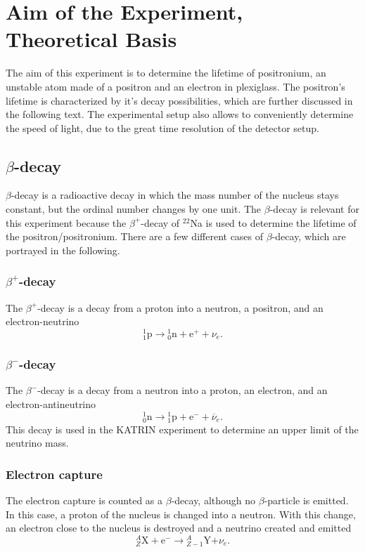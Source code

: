 \chapter{Aim of the Experiment, Theoretical Basis }

The aim of this experiment is to determine the lifetime of positronium, an unstable atom made of a positron and an electron in plexiglass. The positron's lifetime is characterized by it's decay possibilities, which are further discussed in the following text. The experimental setup also allows to conveniently determine the speed of light, due to the great time resolution of the detector setup.

\section{$\beta$-decay}
$\beta$-decay is a radioactive decay in which the mass number of the nucleus stays constant, but the ordinal number changes by one unit. The $\beta$-decay is relevant for this experiment because the $\beta^+$-decay of $^{22}$Na is used to determine the lifetime of the positron/positronium. There are a few different cases of $\beta$-decay, which are portrayed in the following.
\subsection{$\beta^+$-decay}
The $\beta^+$-decay is a decay from a proton into a neutron, a positron, and an electron-neutrino
$${}_{{1}}^{{1}}{\mathrm {p}}\to {}_{{0}}^{{1}}{\mathrm {n}}+{\mathrm {e}}^{{+}}+\nu _{e}\mathrm{.}$$

\subsection{$\beta^-$-decay}
The $\beta^-$-decay is a decay from a neutron into a proton, an electron, and an electron-antineutrino
$${}_{{0}}^{{1}}{\mathrm {n}}\to {}_{{1}}^{{1}}{\mathrm {p}}+{\mathrm {e}}^{{-}}+\overline {\nu }_{e}\mathrm{.}$$
This decay is used in the KATRIN experiment to determine an upper limit of the neutrino mass. 
\subsection{Electron capture}
The electron capture is counted as a $\beta$-decay, although no $\beta$-particle is emitted. In this case, a proton of the nucleus is changed into a neutron. With this change, an electron close to the nucleus is destroyed and a neutrino created and emitted
$${\displaystyle {}_{Z}^{A}\mathrm {X} +\mathrm {e} ^{-}\to {}_{Z-1}^{A}\mathrm {Y} \mathrm {+} \nu _{e}}\mathrm{.}$$

